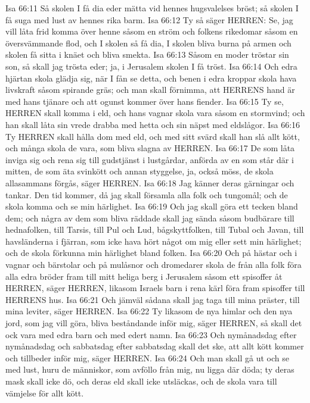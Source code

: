 Isa 66:11  Så skolen I få dia eder mätta vid hennes hugsvalelses bröst; så skolen I få suga med lust av hennes rika barm.
Isa 66:12  Ty så säger HERREN: Se, jag vill låta frid komma över henne såsom en ström och folkens rikedomar såsom en översvämmande flod, och I skolen så få dia, I skolen bliva burna på armen och skolen få sitta i knäet och bliva smekta.
Isa 66:13  Såsom en moder tröstar sin son, så skall jag trösta eder; ja, i Jerusalem skolen I få tröst.
Isa 66:14  Och edra hjärtan skola glädja sig, när I fån se detta, och benen i edra kroppar skola hava livskraft såsom spirande gräs; och man skall förnimma, att HERRENS hand är med hans tjänare och att ogunst kommer över hans fiender.
Isa 66:15  Ty se, HERREN skall komma i eld, och hans vagnar skola vara såsom en stormvind; och han skall låta sin vrede drabba med hetta och sin näpst med eldslågor.
Isa 66:16  Ty HERREN skall hålla dom med eld, och med sitt svärd skall han slå allt kött, och många skola de vara, som bliva slagna av HERREN.
Isa 66:17  De som låta inviga sig och rena sig till gudstjänst i lustgårdar, anförda av en som står där i mitten, de som äta svinkött och annan styggelse, ja, också möss, de skola allasammans förgås, säger HERREN.
Isa 66:18  Jag känner deras gärningar och tankar. Den tid kommer, då jag skall församla alla folk och tungomål; och de skola komma och se min härlighet.
Isa 66:19  Och jag skall göra ett tecken bland dem; och några av dem som bliva räddade skall jag sända såsom budbärare till hednafolken, till Tarsis, till Pul och Lud, bågskyttfolken, till Tubal och Javan, till havsländerna i fjärran, som icke hava hört något om mig eller sett min härlighet; och de skola förkunna min härlighet bland folken.
Isa 66:20  Och på hästar och i vagnar och bärstolar och på mulåsnor och dromedarer skola de från alla folk föra alla edra bröder fram till mitt heliga berg i Jerusalem såsom ett spisoffer åt HERREN, säger HERREN, likasom Israels barn i rena kärl föra fram spisoffer till HERRENS hus.
Isa 66:21  Och jämväl sådana skall jag taga till mina präster, till mina leviter, säger HERREN.
Isa 66:22  Ty likasom de nya himlar och den nya jord, som jag vill göra, bliva beståndande inför mig, säger HERREN, så skall det ock vara med edra barn och med edert namn.
Isa 66:23  Och nymånadsdag efter nymånadsdag och sabbatsdag efter sabbatsdag skall det ske, att allt kött kommer och tillbeder inför mig, säger HERREN.
Isa 66:24  Och man skall gå ut och se med lust, huru de människor, som avföllo från mig, nu ligga där döda; ty deras mask skall icke dö, och deras eld skall icke utsläckas, och de skola vara till vämjelse för allt kött.


